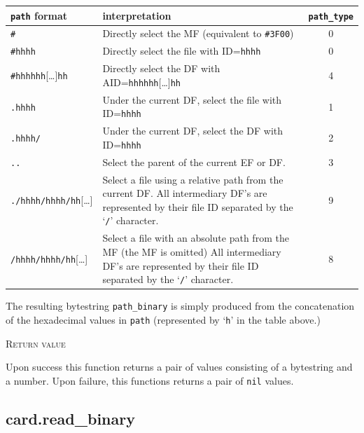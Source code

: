 \documentclass[11pt]{report}
\newcommand{\mansection}[1]{\vspace{0.5em}\par\noindent\textsc{#1}\vspace{0.5em}\par}
\newcommand{\syn}[1]{\texttt{#1}}
\begin{document}
  \vspace{2em}
  \begin{tabular}{|l|p{7cm}|c|}
  \hline
  \syn{path} format 
  & interpretation
  & \syn{path\_type} \\
  \hline
  \hline
  \texttt{\#}
  & Directly select the MF (equivalent to \texttt{\#3F00})
  & 0 \\
  \hline
  \texttt{\#hhhh}
  & Directly select the file with ID=\texttt{hhhh}
  & 0 \\
  \hline
  \texttt{\#hhhhhh}[\ldots ]\texttt{hh}
  & Directly select the DF with AID=\texttt{hhhhhh}[\ldots ]\texttt{hh}    
  & 4 \\
  \hline
  \hline
  \texttt{.hhhh}
  & Under the current DF, select the file with ID=\texttt{hhhh} 
  & 1 \\
  \hline
  \texttt{.hhhh/}
  & Under the current DF, select the DF with ID=\texttt{hhhh}   
  & 2 \\
  \hline
  \texttt{..} 
  & Select the parent of the current EF or DF.
  & 3 \\
  \hline
  \hline
  \texttt{./hhhh/hhhh/hh}[\ldots ]
  & Select a file using a relative path from the current DF. 
    All intermediary DF's are represented by their file ID 
    separated by the `\texttt{/}' character.
  & 9 \\
  \hline
  \texttt{/hhhh/hhhh/hh}[\ldots ] 
  & Select a file with an absolute path from the MF (the MF is omitted) 
    All intermediary DF's are represented by their file ID 
    separated by the `\texttt{/}' character.
   & 8 \\
  \hline
  \end{tabular}
  \vspace{2em}
  

  The resulting bytestring \syn{path\_binary} is simply produced from the concatenation 
  of the hexadecimal values in \syn{path} (represented by `\texttt{h}' in the table above.)

\mansection{Return value}
  Upon success this function returns a pair of values consisting of a bytestring and a number.
  Upon failure, this functions returns a pair of \syn{nil} values.


\subsection{card.read\_binary}
\end{document}

